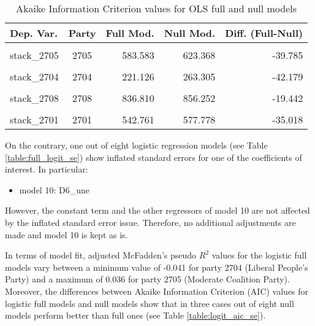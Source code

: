 \documentclass[
]{article}
\providecommand{\tightlist}{%
  \setlength{\itemsep}{0pt}\setlength{\parskip}{0pt}}
\begin{document}
\begin{table}[!h]

\caption{\label{tab:unnamed-chunk-176}Akaike Information Criterion values for OLS full and null models 
        \label{table:ols_aic_se}}
\centering
\begin{tabular}[t]{lcrrr}
\toprule
Dep. Var. & Party & Full Mod. & Null Mod. & Diff. (Full-Null)\\
\midrule
\cellcolor{gray!6}{stack\_2702} & \cellcolor{gray!6}{2702} & \cellcolor{gray!6}{736.830} & \cellcolor{gray!6}{742.960} & \cellcolor{gray!6}{-6.131}\\
stack\_2705 & 2705 & 583.583 & 623.368 & -39.785\\
\cellcolor{gray!6}{stack\_2707} & \cellcolor{gray!6}{2707} & \cellcolor{gray!6}{397.673} & \cellcolor{gray!6}{479.613} & \cellcolor{gray!6}{-81.940}\\
stack\_2704 & 2704 & 221.126 & 263.305 & -42.179\\
\cellcolor{gray!6}{stack\_2703} & \cellcolor{gray!6}{2703} & \cellcolor{gray!6}{216.840} & \cellcolor{gray!6}{266.672} & \cellcolor{gray!6}{-49.831}\\
\addlinespace
stack\_2708 & 2708 & 836.810 & 856.252 & -19.442\\
\cellcolor{gray!6}{stack\_2706} & \cellcolor{gray!6}{2706} & \cellcolor{gray!6}{470.258} & \cellcolor{gray!6}{502.935} & \cellcolor{gray!6}{-32.677}\\
stack\_2701 & 2701 & 542.761 & 577.778 & -35.018\\
\bottomrule
\end{tabular}
\end{table}

On the contrary, one out of eight logistic regression models (see Table \ref{table:full_logit_se}) show
inflated standard errors for one of the coefficients of interest. In particular:

\begin{itemize}
\tightlist
\item
  model 10: D6\_une
\end{itemize}

However, the constant term and the other regressors of model 10 are not affected by the inflated standard error issue. Therefore, no additional adjustments are made and model 10 is kept as is.

In terms of model fit, adjusted McFadden's pseudo \(R^2\) values for the logistic full models vary between
a minimum value of
-0.041
for party 2704
(Liberal People's Party)
and a maximum of
0.036
for party 2705
(Moderate Coalition Party).
Moreover, the differences between Akaike Information Criterion (AIC) values for logistic full models and
null models show that in three cases out of eight null models perform better than full ones (see Table \ref{table:logit_aic_se}).
\end{document}
